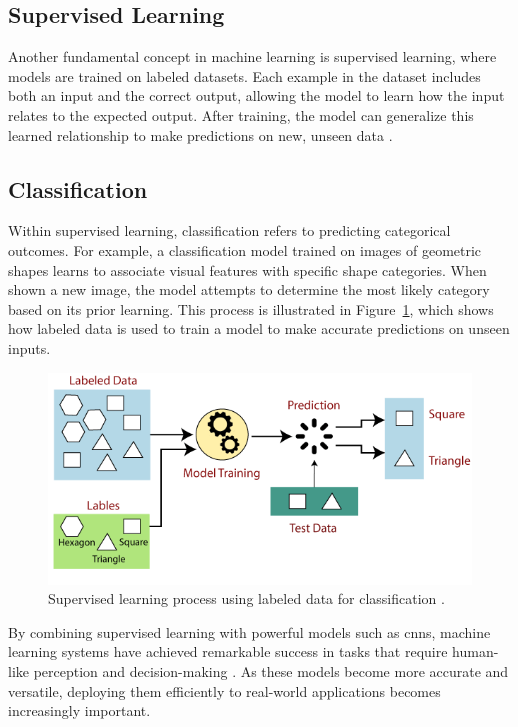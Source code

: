 \subsection{Supervised Learning}

Another fundamental concept in machine learning is supervised learning, where models are trained on labeled datasets. Each example in the dataset includes both an input and the correct output, allowing the model to learn how the input relates to the expected output. After training, the model can generalize this learned relationship to make predictions on new, unseen data \cite{geeksforgeeks:supervised-learning, google:supervised-learning}. \\

\subsection{Classification}

Within supervised learning, classification refers to predicting categorical outcomes. For example, a classification model trained on images of geometric shapes learns to associate visual features with specific shape categories. When shown a new image, the model attempts to determine the most likely category based on its prior learning. This process is illustrated in Figure~\ref{fig:supervised-learning}, which shows how labeled data is used to train a model to make accurate predictions on unseen inputs. \\

\begin{figure}[h!] 
    \centering 
    \includegraphics[width=0.75\linewidth]{figures/theory/machine-learning/supervised-learning.png} \caption[Supervised learning with labeled data]{Supervised learning process using labeled data for classification \cite{tpointtech:supervised-learning}.} 
    \label{fig:supervised-learning} 
\end{figure}

By combining supervised learning with powerful models such as \glspl{cnn}, machine learning systems have achieved remarkable success in tasks that require human-like perception and decision-making \cite{chengyi:cnn}. As these models become more accurate and versatile, deploying them efficiently to real-world applications becomes increasingly important.  \\

